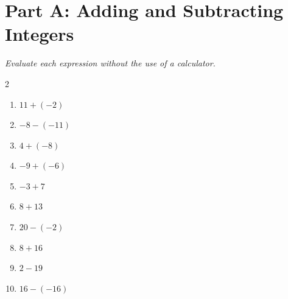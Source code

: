 \documentclass[11pt]{article}
\begin{document}
\section*{Part A: Adding and Subtracting Integers}
\noindent\textit{Evaluate each expression without the use of a calculator.}
\begin{multicols}{2}
\begin{enumerate}
  \item $11 + (-2)$
  \vspace{1.0cm}
  \item $-8 - (-11)$
  \vspace{1.0cm}
  \item $4 + (-8)$
  \vspace{1.0cm}
  \item $-9 + (-6)$
  \vspace{1.0cm}
  \item $-3 + 7$
  \vspace{1.0cm}
  \item $8 + 13$
  \vspace{1.0cm}
  \item $20 - (-2)$
  \vspace{1.0cm}
  \item $8 + 16$
  \vspace{1.0cm}
  \item $2 - 19$
  \vspace{1.0cm}
  \item $16 - (-16)$
  \vspace{1.0cm}
\end{enumerate}
\end{multicols}
\end{document}
